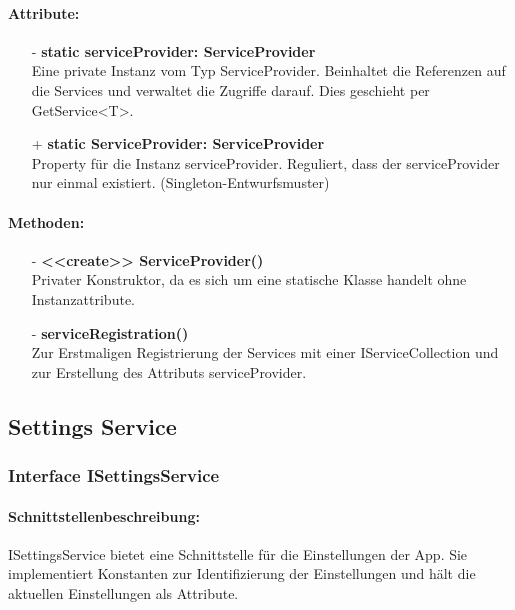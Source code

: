 \documentclass[a4paper,12pt]{article}
\begin{document}
	\paragraph{Attribute:}
	\begin{itemize}
		\item[-] \textbf{static serviceProvider: ServiceProvider}\\Eine private Instanz vom Typ ServiceProvider. Beinhaltet die Referenzen auf die Services und verwaltet die Zugriffe darauf. Dies geschieht per GetService<T>.
		\item[+] \textbf{static ServiceProvider: ServiceProvider}\\Property für die Instanz serviceProvider. Reguliert, dass der serviceProvider nur einmal existiert. (Singleton-Entwurfsmuster)

	\end{itemize}
	\paragraph{Methoden:}
	\begin{itemize}
		\item[-] \textbf{<<create>> ServiceProvider()}\\Privater Konstruktor, da es sich um eine statische Klasse handelt ohne Instanzattribute.
		\item[-] \textbf{serviceRegistration()}\\ Zur Erstmaligen Registrierung der Services mit einer IServiceCollection und zur Erstellung des Attributs serviceProvider.\\
	\end{itemize}
		
		
		
		
		
\subsection{Settings Service}
\subsubsection{Interface ISettingsService}
	\paragraph{Schnittstellenbeschreibung:}
	ISettingsService bietet eine Schnittstelle für die Einstellungen der App. Sie implementiert Konstanten zur Identifizierung der Einstellungen und hält die aktuellen Einstellungen als Attribute.
\end{document}
